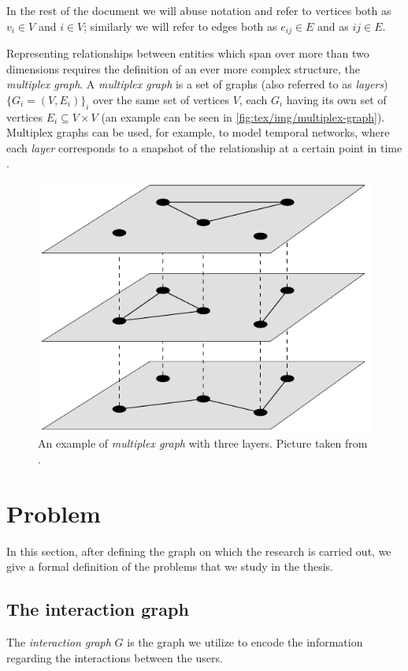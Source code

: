 \bigskip

In the rest of the document we will abuse notation and refer to vertices both
as $v_{i} \in V $ and $i \in V$; similarly we will refer to edges both as
$e_{ij} \in E $ and as $ij \in E$.

\bigskip

Representing relationships between entities which span over more than two
dimensions requires the definition of an ever more complex structure, the
\emph{multiplex graph}. A \emph{multiplex graph} is a set of graphs (also
referred to as \emph{layers}) $\{ G_i = (V, E_i)\} _i$ over the same set of
vertices $V$, each $G_i$ having its own set of vertices $E_i \subseteq V \times V $ (an
example can be seen in \autoref{fig:tex/img/multiplex-graph}). Multiplex graphs
can be used, for example, to model temporal networks, where
each \emph{layer} corresponds to a snapshot of the relationship at a certain
point in time \cite{Newman2018}.

\begin{figure}
	\centering
	\includegraphics[width=0.4\linewidth]{tex/img/multiplex-graph.png}
	\caption[An example of multiplex graph]{An example of \emph{multiplex
			graph} with three layers. Picture taken from
		\cite{Newman2018}.}%
	\label{fig:tex/img/multiplex-graph}
\end{figure}

\section{Problem}
\label{sec:problem}

In this section, after defining the graph on which the research is
carried out, we give a formal definition of the problems that we
study in the thesis.

\subsection{The interaction graph}
\label{sub:interaction-graph}

The \emph{interaction graph} $G$ is the graph we utilize to encode the
information regarding the interactions between the users.

